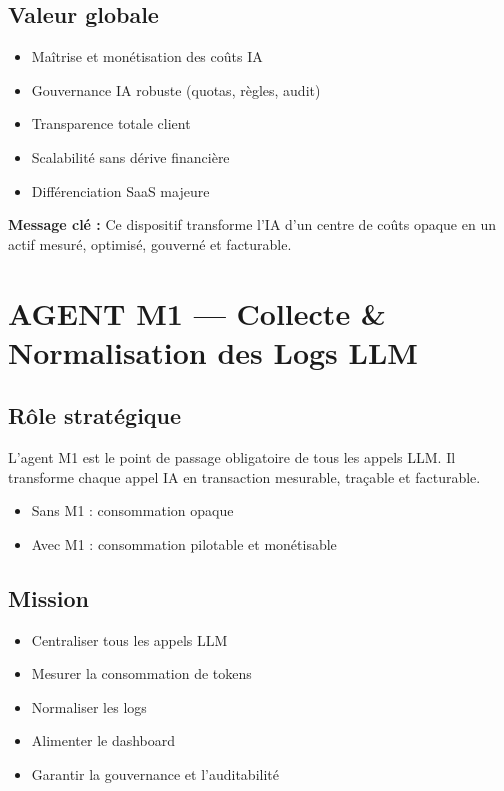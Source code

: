 \documentclass[11pt,a4paper]{article}
\begin{document}
\subsection*{Valeur globale}

\begin{itemize}
\item Maîtrise et monétisation des coûts IA
\item Gouvernance IA robuste (quotas, règles, audit)
\item Transparence totale client
\item Scalabilité sans dérive financière
\item Différenciation SaaS majeure
\end{itemize}

\textbf{Message clé :} Ce dispositif transforme l’IA d’un centre de coûts opaque en un actif mesuré, optimisé, gouverné et facturable.

\newpage

\section{AGENT M1 --- Collecte \& Normalisation des Logs LLM}

\subsection{Rôle stratégique}

L’agent M1 est le point de passage obligatoire de tous les appels LLM. Il transforme chaque appel IA en transaction mesurable, traçable et facturable.

\begin{itemize}
\item Sans M1 : consommation opaque
\item Avec M1 : consommation pilotable et monétisable
\end{itemize}

\subsection{Mission}

\begin{itemize}
\item Centraliser tous les appels LLM
\item Mesurer la consommation de tokens
\item Normaliser les logs
\item Alimenter le dashboard
\item Garantir la gouvernance et l’auditabilité
\end{itemize}
\end{document}
